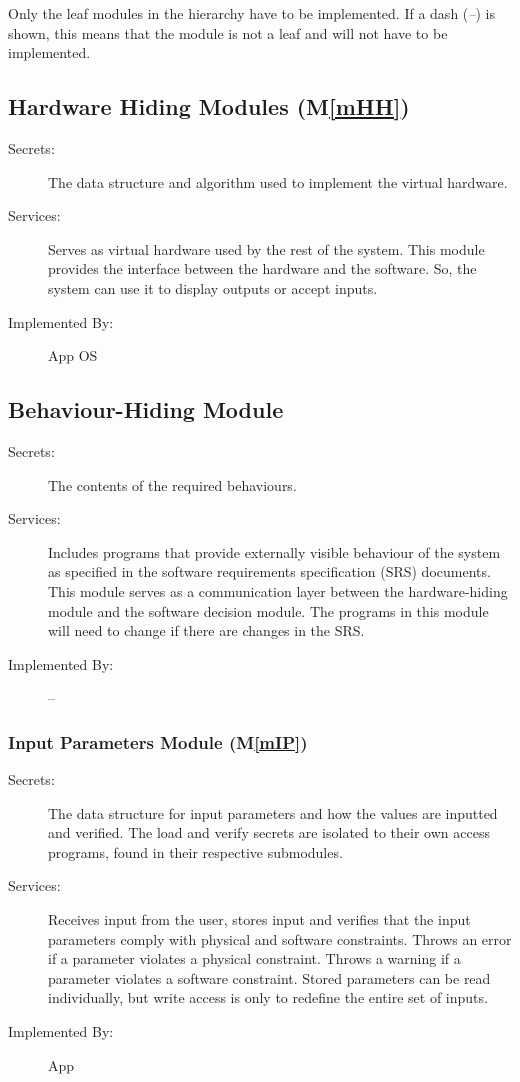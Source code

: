 \documentclass[12pt, titlepage]{article}
\newcommand{\mref}[1]{M\ref{#1}}
\begin{document}
Only the leaf modules in the hierarchy have to be implemented. If a dash
(\emph{--}) is shown, this means that the module is not a leaf and will not have
to be implemented.

\subsection{Hardware Hiding Modules (\mref{mHH})}

\begin{description}
\item[Secrets:]The data structure and algorithm used to implement the virtual
  hardware.
\item[Services:]Serves as virtual hardware used by the rest of the system. This module provides the interface between the hardware and the software. So, the system can use it to display outputs or accept inputs.
\item[Implemented By:] App OS
\end{description}

\subsection{Behaviour-Hiding Module}

\begin{description}
\item[Secrets:]The contents of the required behaviours.
\item[Services:]Includes programs that provide externally visible behaviour of
  the system as specified in the software requirements specification (SRS)
  documents. This module serves as a communication layer between the
  hardware-hiding module and the software decision module. The programs in this
  module will need to change if there are changes in the SRS.
\item[Implemented By:] --
\end{description}

\subsubsection{Input Parameters Module (\mref{mIP})}

\begin{description}
\item[Secrets:]The data structure for input parameters and how the values are inputted and verified. The load and verify secrets are isolated to their own access programs, found in their respective submodules. 
\item[Services:]Receives input from the user, stores input and verifies that the input parameters comply with physical and software constraints. Throws an error if a parameter violates a physical constraint. Throws a warning if a parameter violates a software constraint. Stored parameters can be read individually, but write access is only to redefine the entire set of inputs. 
\item[Implemented By:]App
\end{description}
\end{document}
